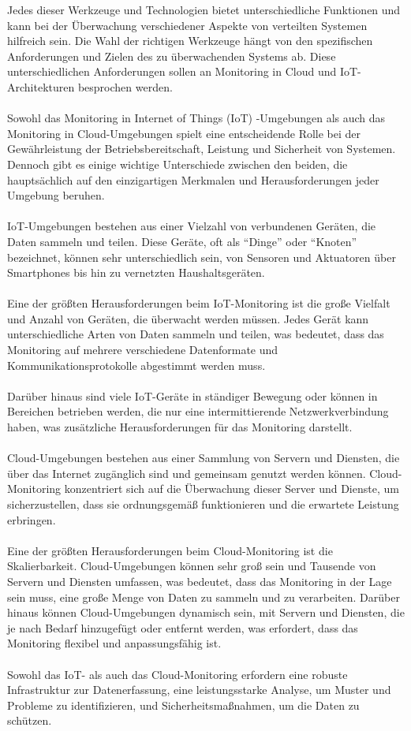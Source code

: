 Jedes dieser Werkzeuge und Technologien bietet unterschiedliche Funktionen und kann bei der Überwachung verschiedener Aspekte von verteilten Systemen hilfreich sein. Die Wahl der richtigen Werkzeuge hängt von den spezifischen Anforderungen und Zielen des zu überwachenden Systems ab. Diese unterschiedlichen Anforderungen sollen an Monitoring in Cloud und IoT-Architekturen besprochen werden. 
\\\\
Sowohl das Monitoring in Internet of Things (IoT) -Umgebungen als auch das Monitoring in Cloud-Umgebungen spielt eine entscheidende Rolle bei der Gewährleistung der Betriebsbereitschaft, Leistung und Sicherheit von Systemen. Dennoch gibt es einige wichtige Unterschiede zwischen den beiden, die hauptsächlich auf den einzigartigen Merkmalen und Herausforderungen jeder Umgebung beruhen.
\\\\
IoT-Umgebungen bestehen aus einer Vielzahl von verbundenen Geräten, die Daten sammeln und teilen. Diese Geräte, oft als \enquote{Dinge} oder \enquote{Knoten} bezeichnet, können sehr unterschiedlich sein, von Sensoren und Aktuatoren über Smartphones bis hin zu vernetzten Haushaltsgeräten.
\\\\
Eine der größten Herausforderungen beim IoT-Monitoring ist die große Vielfalt und Anzahl von Geräten, die überwacht werden müssen. Jedes Gerät kann unterschiedliche Arten von Daten sammeln und teilen, was bedeutet, dass das Monitoring auf mehrere verschiedene Datenformate und Kommunikationsprotokolle abgestimmt werden muss.
\\\\
Darüber hinaus sind viele IoT-Geräte in ständiger Bewegung oder können in Bereichen betrieben werden, die nur eine intermittierende Netzwerkverbindung haben, was zusätzliche Herausforderungen für das Monitoring darstellt.
\\\\
Cloud-Umgebungen bestehen aus einer Sammlung von Servern und Diensten, die über das Internet zugänglich sind und gemeinsam genutzt werden können. Cloud-Monitoring konzentriert sich auf die Überwachung dieser Server und Dienste, um sicherzustellen, dass sie ordnungsgemäß funktionieren und die erwartete Leistung erbringen.
\\\\
Eine der größten Herausforderungen beim Cloud-Monitoring ist die Skalierbarkeit. Cloud-Umgebungen können sehr groß sein und Tausende von Servern und Diensten umfassen, was bedeutet, dass das Monitoring in der Lage sein muss, eine große Menge von Daten zu sammeln und zu verarbeiten. Darüber hinaus können Cloud-Umgebungen dynamisch sein, mit Servern und Diensten, die je nach Bedarf hinzugefügt oder entfernt werden, was erfordert, dass das Monitoring flexibel und anpassungsfähig ist.
\\\\
Sowohl das IoT- als auch das Cloud-Monitoring erfordern eine robuste Infrastruktur zur Datenerfassung, eine leistungsstarke Analyse, um Muster und Probleme zu identifizieren, und Sicherheitsmaßnahmen, um die Daten zu schützen. 
